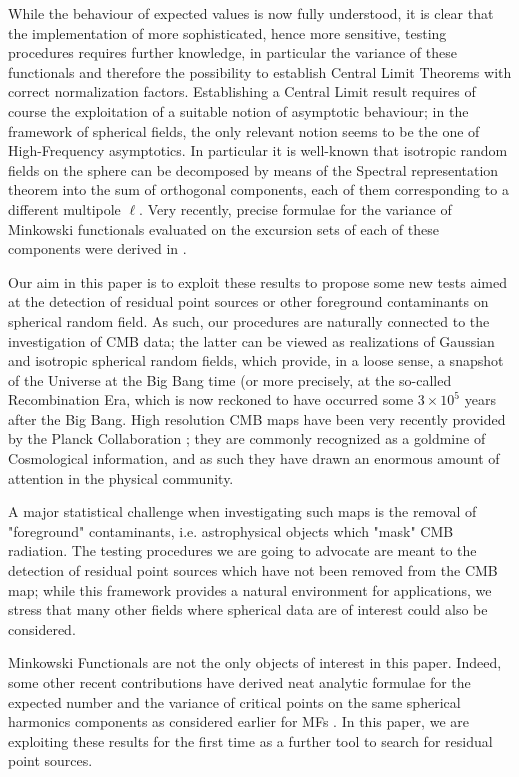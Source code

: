 \documentclass[aps,prd,showpacs,superscriptaddress,groupedaddress]{revtex4-1}  %
\begin{document}
While the behaviour of expected values is now fully understood, it is clear that the implementation of more sophisticated, hence more sensitive, testing procedures requires further knowledge, in particular the variance of these functionals and therefore the possibility to establish Central Limit Theorems with correct normalization factors. Establishing a Central Limit result requires of course the exploitation of a suitable notion of asymptotic behaviour; in the framework of spherical fields, the only relevant notion seems to be the one of High-Frequency asymptotics. In particular it is well-known that isotropic random fields on the sphere can be decomposed by means of the Spectral representation theorem into the sum of orthogonal components, each of them corresponding to a different multipole $\ell$. Very recently, precise formulae for the variance of Minkowski functionals evaluated on the excursion sets of each of these components were derived in \cite{cm1603}.


Our aim in this paper is to exploit these results to propose some new tests aimed at the detection of residual point sources or other foreground contaminants on spherical random field. As such, our procedures are naturally connected to the investigation of CMB data; the latter can be viewed as realizations of Gaussian and isotropic spherical random fields, which provide, in a loose sense, a snapshot of the Universe at the Big Bang time (or more precisely, at the so-called Recombination Era, which is now reckoned to have occurred some $3 \times 10^5$ years after the Big Bang. High resolution CMB maps have been very recently provided by the Planck Collaboration \cite{planck2013-p01}; they are commonly recognized as a goldmine of Cosmological information, and as such they have drawn an enormous amount of attention in the physical community. 

A major statistical challenge when investigating such maps is the removal of "foreground" contaminants, i.e. astrophysical objects which "mask" CMB radiation. The testing procedures we are going to advocate are meant to the detection of residual point sources which have not been removed from the CMB map; while this framework provides a natural environment for applications, we stress that many other fields where spherical data are of interest could also be considered. 

Minkowski Functionals are not the only objects of interest in this paper. Indeed, some other recent contributions have derived neat analytic formulae for the expected number and the variance of critical points on the same spherical harmonics components as considered earlier for MFs \cite{cm1603}. In this paper, we are exploiting these results for the first time as a further tool to search for residual point sources.   
\end{document}
